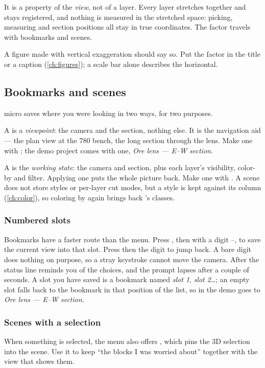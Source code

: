 It is a property of the \emph{view}, not of a layer. Every layer stretches together and stays registered, and nothing is measured in the stretched space: picking, measuring and section positions all stay in true coordinates. The factor travels with bookmarks and scenes.

\begin{note}
A figure made with vertical exaggeration should say so. Put the factor in the title or a caption (\cref{ch:figures}); a scale bar alone describes the horizontal.
\end{note}

\subsection{Bookmarks and scenes}\label{sec:sections-scenes}
micro saves where you were looking in two ways, for two purposes.

A  is a \emph{viewpoint}: the camera and the section, nothing else. It is the navigation aid — the plan view at the 780 bench, the long section through the lens. Make one with ; the demo project comes with one, \emph{Ore lens — E–W section}.

A  is the \emph{working state}: the camera and section, plus each layer's visibility, color-by and filter. Applying one puts the whole picture back. Make one with . A scene does not store styles or per-layer cut modes, but a style is kept against its column (\cref{ch:color}), so coloring by  again brings back 's classes.

\subsubsection{Numbered slots}
Bookmarks have a faster route than the menu. Press , then  with a digit –, to save the current view into that slot. Press  then the digit to jump back. A bare digit does nothing on purpose, so a stray keystroke cannot move the camera. After  the status line reminds you of the choices, and the prompt lapses after a couple of seconds. A slot you have saved is a bookmark named \emph{slot 1}, \emph{slot 2}…; an empty slot falls back to the bookmark in that position of the list, so in the demo   goes to \emph{Ore lens — E–W section}.

\subsubsection{Scenes with a selection}
When something is selected, the menu also offers , which pins the 3D selection into the scene. Use it to keep “the blocks I was worried about” together with the view that shows them.

